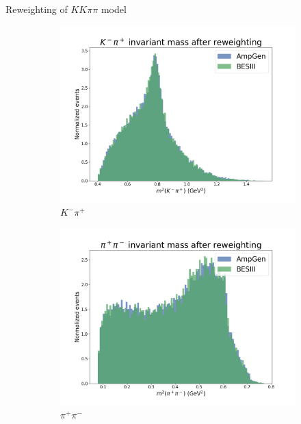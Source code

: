 \documentclass{beamer}
\begin{document}
\begin{frame}{Reweighting of \texorpdfstring{$KK\pi\pi$}{KKpipi} model}
\begin{figure}
\begin{subfigure}{0.33\textwidth}
      \centering
      \includegraphics[width=\textwidth]{Plots/s12_AfterReweighting.png}
      \caption{$K^-\pi^+$}
    \end{subfigure}
    \begin{subfigure}{0.33\textwidth}
      \centering
      \includegraphics[width=\textwidth]{Plots/s23_AfterReweighting.png}
      \caption{$\pi^+\pi^-$}
    \end{subfigure}%
    \begin{subfigure}{0.33\textwidth}
      \centering

\end{subfigure}
\end{figure}
\end{frame}
\end{document}
